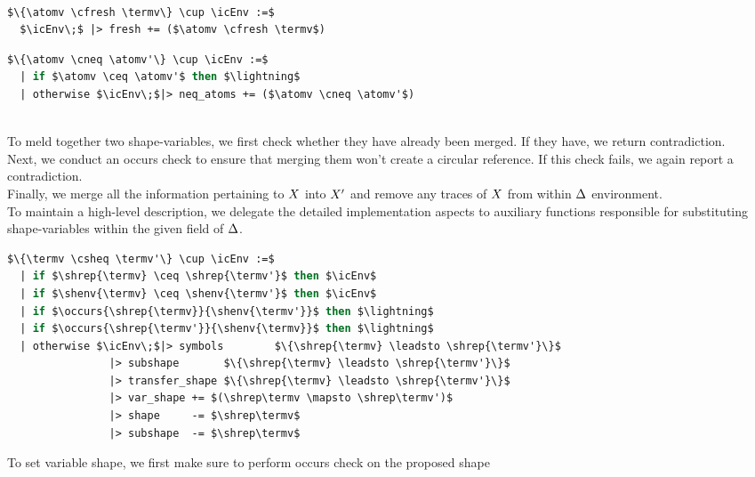 \documentclass[english, mgr]{iithesis}
\begin{document}
\\
\begin{minipage}{0.4\textwidth}
\begin{lstlisting}[mathescape, language=OCaml]
$\{\atomv \cfresh \termv\} \cup \icEnv :=$
  $\icEnv\;$ |> fresh += ($\atomv \cfresh \termv$)


\end{lstlisting}
\end{minipage}
\begin{minipage}{0.6\textwidth}
\begin{lstlisting}[mathescape, language=OCaml]
$\{\atomv \cneq \atomv'\} \cup \icEnv :=$
  | if $\atomv \ceq \atomv'$ then $\lightning$
  | otherwise $\icEnv\;$|> neq_atoms += ($\atomv \cneq \atomv'$)
\end{lstlisting}
\end{minipage}
\\
To meld together two shape-variables, we first check whether they have already been merged.
If they have, we return contradiction.
\\
Next, we conduct an occurs check to ensure that merging them won't create a circular reference. If this check fails, we again report a contradiction.
\\
Finally, we merge all the information pertaining to $X$ into $X'$ and
remove any traces of $X$ from within $\Delta$ environment.
\\
To maintain a high-level description, we delegate the detailed implementation aspects to auxiliary functions responsible for substituting shape-variables within the given field of $\Delta$.
\begin{lstlisting}[mathescape, language=OCaml]
$\{\termv \csheq \termv'\} \cup \icEnv :=$
  | if $\shrep{\termv} \ceq \shrep{\termv'}$ then $\icEnv$
  | if $\shenv{\termv} \ceq \shenv{\termv'}$ then $\icEnv$
  | if $\occurs{\shrep{\termv}}{\shenv{\termv'}}$ then $\lightning$
  | if $\occurs{\shrep{\termv'}}{\shenv{\termv}}$ then $\lightning$
  | otherwise $\icEnv\;$|> symbols        $\{\shrep{\termv} \leadsto \shrep{\termv'}\}$
                |> subshape       $\{\shrep{\termv} \leadsto \shrep{\termv'}\}$
                |> transfer_shape $\{\shrep{\termv} \leadsto \shrep{\termv'}\}$
                |> var_shape += $(\shrep\termv \mapsto \shrep\termv')$
                |> shape     -= $\shrep\termv$
                |> subshape  -= $\shrep\termv$
\end{lstlisting}
To set variable shape, we first make sure to perform occurs check on the proposed shape
\end{document}
